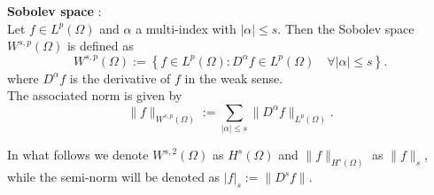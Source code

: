 {\begin{definition} \label{SobolevSpace}
  \textbf{Sobolev space} \cite{Ciarlet}: \\
  Let $f \in L^p(\Omega)$ and $\alpha$ a multi-index with $|\alpha| \le s$. Then
  the Sobolev space $W^{s,p}(\Omega)$ is defined as
  \begin{equation}
    W^{s,p}(\Omega) := \left\{ f\in L^p(\Omega) : D^{\alpha} f \in
      L^p(\Omega)\quad \forall |\alpha| \le s\right\}.
    \label{eqn:Sobolev}
  \end{equation}
  where $D^{\alpha}f$ is the derivative of $f$ in the weak sense.\\
  The associated norm is given by
  \begin{equation}
    \|f\|_{W^{s,p}(\Omega)} := \sum_{|\alpha|\le s}
      \|D^{\alpha}f\|_{L^p(\Omega)}.
    \label{eqn:HkpNorm}
  \end{equation}
\end{definition}
In what follows we denote $W^{s,2}(\Omega)$ as $H^s(\Omega)$ and
$\|f\|_{H^s(\Omega)}$ as $\|f\|_s$, while the semi-norm will be denoted
as $|f|_s := \|D^s f\|$.}
